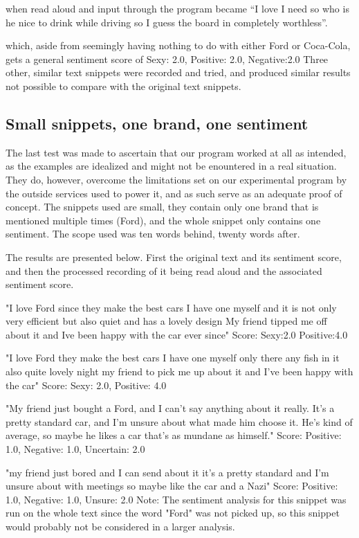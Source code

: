 \documentclass[a4paper,12pt,twoside]{ltxdoc}
\begin{document}
when read aloud and input through the program became ``I love I need so who is he nice to drink while driving so I guess the board in completely worthless''.

which, aside from seemingly having nothing to do with either Ford or Coca-Cola, gets a general sentiment score of 
Sexy: 2.0, Positive: 2.0, Negative:2.0
Three other, similar text snippets were recorded and tried, and produced similar results not possible to compare with the original text snippets.

\subsection{Small snippets, one brand, one sentiment}
The last test was made to ascertain that our program worked at all as intended, as the examples are idealized and might not be enountered in a real situation. They do, however, overcome the limitations set on our experimental program by the outside services used to power it, and as such serve as an adequate proof of concept. The snippets used are small, they contain only one brand that is mentioned multiple times (Ford), and the whole snippet only contains one sentiment. The scope used was ten words behind, twenty words after.

The results are presented below. First the original text and its sentiment score, and then the processed recording of it being read aloud and the associated sentiment score.

"I love Ford since they make the best cars I have one myself and it is not only very efficient but also quiet and has a lovely design My friend tipped me off about it and Ive been happy with the car ever since"
Score: Sexy:2.0 Positive:4.0

"I love Ford they make the best cars I have one myself only there any fish in it also quite lovely night my friend to pick me up about it and I've been happy with the car"
Score: Sexy: 2.0, Positive: 4.0

"My friend just bought a Ford, and I can't say anything about it really. It's a pretty standard car, and I'm unsure about what made him choose it. He's kind of average, so maybe he likes a car that's as mundane as himself."
Score: Positive: 1.0, Negative: 1.0, Uncertain: 2.0

"my friend just bored and I can send about it it's a pretty standard and I'm unsure about with meetings so maybe like the car and a Nazi"
Score: Positive: 1.0, Negative: 1.0, Unsure: 2.0
Note: The sentiment analysis for this snippet was run on the whole text since the word "Ford" was not picked up, so this snippet would probably not be considered in a larger analysis.
\end{document}
